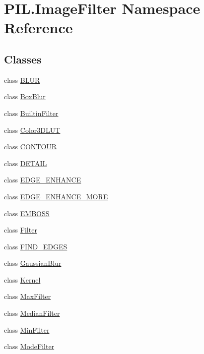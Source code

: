 \hypertarget{namespacePIL_1_1ImageFilter}{}\section{P\+I\+L.\+Image\+Filter Namespace Reference}
\label{namespacePIL_1_1ImageFilter}
\subsection*{Classes}
\begin{DoxyCompactItemize}
\item 
class \hyperlink{classPIL_1_1ImageFilter_1_1BLUR}{B\+L\+UR}
\item 
class \hyperlink{classPIL_1_1ImageFilter_1_1BoxBlur}{Box\+Blur}
\item 
class \hyperlink{classPIL_1_1ImageFilter_1_1BuiltinFilter}{Builtin\+Filter}
\item 
class \hyperlink{classPIL_1_1ImageFilter_1_1Color3DLUT}{Color3\+D\+L\+UT}
\item 
class \hyperlink{classPIL_1_1ImageFilter_1_1CONTOUR}{C\+O\+N\+T\+O\+UR}
\item 
class \hyperlink{classPIL_1_1ImageFilter_1_1DETAIL}{D\+E\+T\+A\+IL}
\item 
class \hyperlink{classPIL_1_1ImageFilter_1_1EDGE__ENHANCE}{E\+D\+G\+E\+\_\+\+E\+N\+H\+A\+N\+CE}
\item 
class \hyperlink{classPIL_1_1ImageFilter_1_1EDGE__ENHANCE__MORE}{E\+D\+G\+E\+\_\+\+E\+N\+H\+A\+N\+C\+E\+\_\+\+M\+O\+RE}
\item 
class \hyperlink{classPIL_1_1ImageFilter_1_1EMBOSS}{E\+M\+B\+O\+SS}
\item 
class \hyperlink{classPIL_1_1ImageFilter_1_1Filter}{Filter}
\item 
class \hyperlink{classPIL_1_1ImageFilter_1_1FIND__EDGES}{F\+I\+N\+D\+\_\+\+E\+D\+G\+ES}
\item 
class \hyperlink{classPIL_1_1ImageFilter_1_1GaussianBlur}{Gaussian\+Blur}
\item 
class \hyperlink{classPIL_1_1ImageFilter_1_1Kernel}{Kernel}
\item 
class \hyperlink{classPIL_1_1ImageFilter_1_1MaxFilter}{Max\+Filter}
\item 
class \hyperlink{classPIL_1_1ImageFilter_1_1MedianFilter}{Median\+Filter}
\item 
class \hyperlink{classPIL_1_1ImageFilter_1_1MinFilter}{Min\+Filter}
\item 
class \hyperlink{classPIL_1_1ImageFilter_1_1ModeFilter}{Mode\+Filter}

\end{DoxyCompactItemize}
